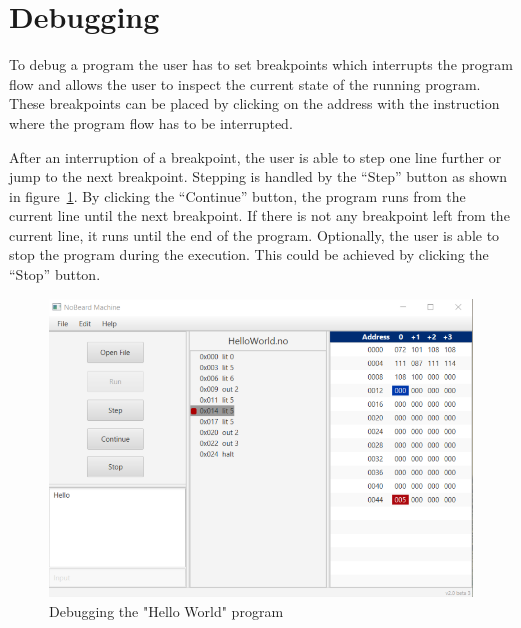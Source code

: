 \section{Debugging}
To debug a program the user has to set breakpoints which interrupts the program flow and allows the user to inspect the current state of the running program. These breakpoints can be placed by clicking on the address  with the instruction where the program flow has to be interrupted. 

After an interruption  of a breakpoint, the user is able to step one line further or  jump to the next breakpoint. Stepping is handled by the “Step” button as shown in figure~\ref{fig:debugging}. By clicking the “Continue” button, the program runs from the current line until the next breakpoint. If there is not any breakpoint left from the current line, it runs until the end of the program. Optionally, the user is able to stop the program during the execution. This could be achieved by clicking the “Stop” button.
\begin{figure}[h] 
	\centering
	\includegraphics[scale=.85]{images/screenshot-2.png}
	\caption{Debugging the "Hello World" program}
	\label{fig:debugging}
\end{figure}

